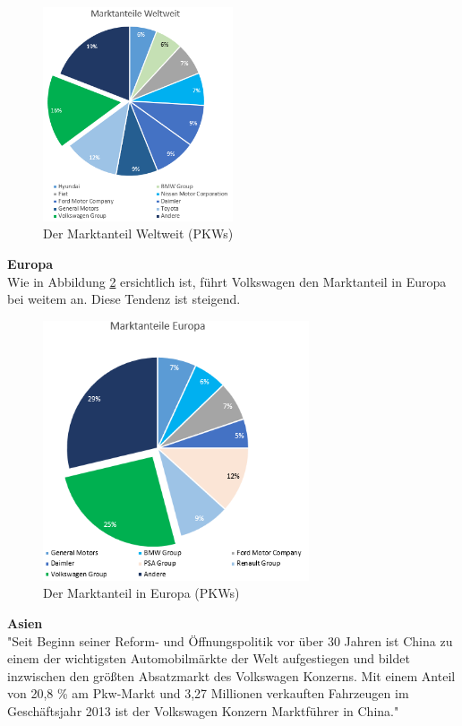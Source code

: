 \documentclass[12pt]{article}
\begin{document}
\begin{figure}[here!]
\centering
\includegraphics[width=0.5\textwidth]{images/maww}
\caption{Der Marktanteil Weltweit (PKWs)}
\label{fig:marktwelt}
\end{figure}\FloatBarrier
\noindent
\textbf{Europa}\\
Wie in Abbildung \ref{fig:markteuropa} ersichtlich ist, führt Volkswagen den Marktanteil in Europa bei weitem an. Diese Tendenz ist steigend.
\begin{figure}[here!]
\centering
\includegraphics[width=0.7\textwidth]{images/maie}
\caption{Der Marktanteil in Europa (PKWs)}
\label{fig:markteuropa}
\end{figure}\FloatBarrier
\noindent
\textbf{Asien}\\
"Seit Beginn seiner Reform- und Öffnungspolitik vor über 30 Jahren ist China zu einem der wichtigsten Automobilmärkte der Welt aufgestiegen und bildet inzwischen den größten Absatzmarkt des Volkswagen Konzerns. Mit einem Anteil von 20,8 \% am Pkw-Markt und 3,27 Millionen verkauften Fahrzeugen im Geschäftsjahr 2013 ist der Volkswagen Konzern Marktführer in China."\cite{vwwebsitechina}\\
\end{document}
